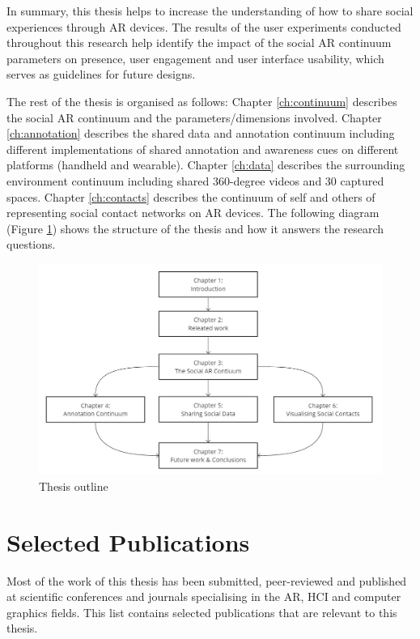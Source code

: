 In summary, this thesis helps to increase the understanding of how to share social experiences through AR devices. The results of the user experiments conducted throughout this research help identify the impact of the social AR continuum parameters on presence, user engagement and user interface usability, which serves as guidelines for future designs. 

The rest of the thesis is organised as follows: Chapter \ref{ch:continuum} describes the social AR continuum and the parameters/dimensions involved. Chapter \ref{ch:annotation} describes the shared data and annotation continuum including different implementations of shared annotation and awareness cues on different platforms (handheld and wearable). Chapter \ref{ch:data} describes the surrounding environment continuum including shared 360-degree videos and 30 captured spaces. Chapter \ref{ch:contacts} describes the continuum of self and others of representing social contact networks on AR devices. The following diagram (Figure \ref{fig:thesis-outline}) shows the structure of the thesis and how it answers the research questions. 

\begin{figure}
    \centering
    \includegraphics[width=\linewidth]{images/thesis-outline.png}
    \caption{Thesis outline}
    \label{fig:thesis-outline}
\end{figure}

\section{Selected Publications}

Most of the work of this thesis has been submitted, peer-reviewed and published at scientific conferences and journals specialising in the AR, HCI and computer graphics fields. This list contains selected publications that are relevant to this thesis. 

